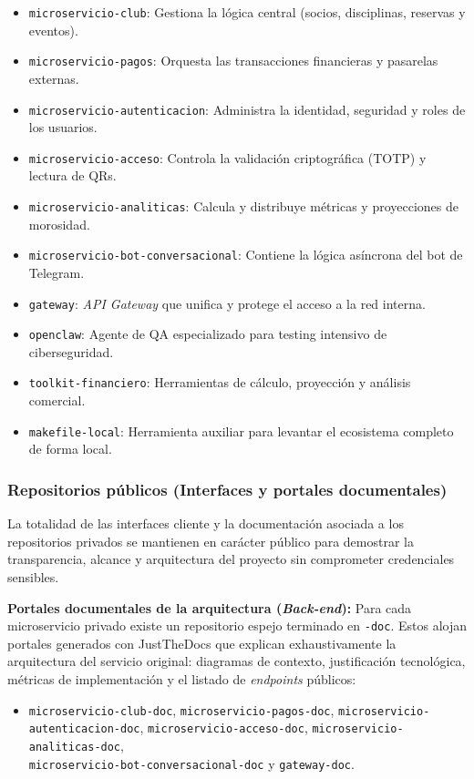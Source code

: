 \begin{itemize}
    \item \texttt{microservicio-club}: Gestiona la lógica central (socios, disciplinas, reservas y eventos).
    \item \texttt{microservicio-pagos}: Orquesta las transacciones financieras y pasarelas externas.
    \item \texttt{microservicio-autenticacion}: Administra la identidad, seguridad y roles de los usuarios.
    \item \texttt{microservicio-acceso}: Controla la validación criptográfica (TOTP) y lectura de QRs.
    \item \texttt{microservicio-analiticas}: Calcula y distribuye métricas y proyecciones de morosidad.
    \item \texttt{microservicio-bot-conversacional}: Contiene la lógica asíncrona del bot de Telegram.
    \item \texttt{gateway}: \textit{API Gateway} que unifica y protege el acceso a la red interna.
    \item \texttt{openclaw}: Agente de QA especializado para testing intensivo de ciberseguridad.
    \item \texttt{toolkit-financiero}: Herramientas de cálculo, proyección y análisis comercial.
    \item \texttt{makefile-local}: Herramienta auxiliar para levantar el ecosistema completo de forma local.
\end{itemize}

\subsubsection{Repositorios públicos (Interfaces y portales documentales)}

La totalidad de las interfaces cliente y la documentación asociada a los repositorios privados se mantienen en carácter público para demostrar la transparencia, alcance y arquitectura del proyecto sin comprometer credenciales sensibles.

\textbf{Portales documentales de la arquitectura (\textit{Back-end}):} Para cada microservicio privado existe un repositorio espejo terminado en \texttt{-doc}. Estos alojan portales generados con JustTheDocs que explican exhaustivamente la arquitectura del servicio original: diagramas de contexto, justificación tecnológica, métricas de implementación y el listado de \textit{endpoints} públicos:
\begin{itemize}
    \item \texttt{microservicio-club-doc}, \texttt{microservicio-pagos-doc}, \texttt{microservicio-autenticacion-doc}, \texttt{microservicio-acceso-doc}, \texttt{microservicio-analiticas-doc}, \\ \texttt{microservicio-bot-conversacional-doc} y \texttt{gateway-doc}.
\end{itemize}

